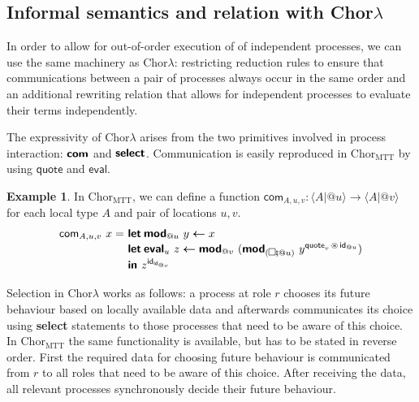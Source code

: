 \documentclass{scrartcl}
\theoremstyle{definition}
\newtheorem{example}{Example}
\theoremstyle{plain}
\renewcommand{\square}%
  {\tikz{\draw (0,0) rectangle (0.2cm,0.2cm);}}
\newcommand{\primitive}[1]{\textsf{\textbf{#1}}}
\newcommand{\ChorMTT}{Chor${}_{\textrm{MTT}}$}
\begin{document}
\subsection{Informal semantics and relation with
  \texorpdfstring{Chor$\lambda$}{ChorLambda}}
In order to allow for out-of-order execution of of independent processes, we
can use the same machinery as Chor$\lambda$: restricting reduction rules to
ensure that communications between a pair of processes always occur in the same
order and an additional rewriting relation that allows for independent
processes to evaluate their terms independently.

The expressivity of Chor$\lambda$ arises from the two primitives involved in
process interaction: $\primitive{com}$ and $\primitive{select}$. Communication
is easily reproduced in \ChorMTT{} by using $\textsf{quote}$ and
$\textsf{eval}$.
\begin{example}
  In \ChorMTT, we can define a function $\textsf{com}_{A,u,v} : \langle A | @u
  \rangle \to \langle A | @v \rangle$ for each local type $A$ and pair of
  locations $u,v$.
  \begin{align*}
    \textsf{com}_{A,u,v}\ x =
    \ & \primitive{let}\:\primitive{mod}_{@u}\ y \bm{\leftarrow} x\\[-3pt]
      & \primitive{let}\:\primitive{eval}_u\ z \bm{\leftarrow} \primitive{mod}_{@v}\ (\primitive{mod}_{(\square \fatsemi @u)}\ 
        y^{\textsf{quote}_v \,\circledast\, \textsf{id}_{@u}})\\[-3pt]
      & \primitive{in } z^{\textsf{id}_{\textsf{id}_{@v}}}
  \end{align*}
\end{example}
\noindent
Selection in Chor$\lambda$ works as follows: a process at role $r$ chooses its
future behaviour based on locally available data and afterwards communicates
its choice using \primitive{select} statements to those processes that need to
be aware of this choice. In \ChorMTT{} the same functionality is available, but
has to be stated in reverse order. First the required data for choosing future
behaviour is communicated from $r$ to all roles that need to be aware of this
choice. After receiving the data, all relevant processes synchronously decide
their future behaviour.
\end{document}
